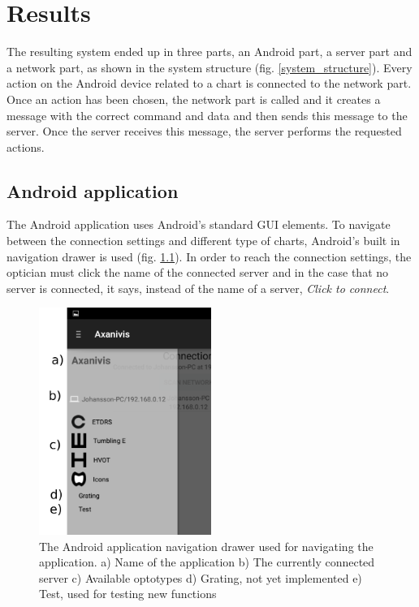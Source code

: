 \documentclass[12pt,a4paper,notitlepage]{report}
\begin{document}
\chapter{ Results}%
The resulting system ended up in three parts, an Android part, a server part and a network part, as shown in the system structure (fig. \ref{system_structure}). Every action on the Android device related to a chart is connected to the network part. Once an action has been chosen, the network part is called and it creates a message with the correct command and data and then sends this message to the server. Once the server receives this message, the server performs the requested actions.

\section{Android application}
The Android application uses Android's standard GUI elements. To navigate between the connection settings and different type of charts, Android's built in navigation drawer is used (fig. \ref{fig:app_nav_drawer}). In order to reach the connection settings, the optician must click the name of the connected server and in the case that no server is connected, it says, instead of the name of a server, \textit{Click to connect}.

\begin{figure}[ht!]
\centering
\includegraphics[width=56mm]{images/appgui/nav_drawer.png}
\caption[Android Navigation Drawer]{The Android application navigation drawer used for navigating the application. a) Name of the application b) The currently connected server c) Available optotypes d) Grating, not yet implemented e) Test, used for testing new functions}
\label{fig:app_nav_drawer}
\end{figure}
\end{document}
